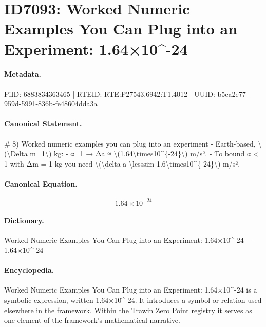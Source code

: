 \section*{ID7093: Worked Numeric Examples You Can Plug into an Experiment: 1.64×10\textasciicircum{}-24}
\paragraph{Metadata.}
PiID: 6883834363465 | RTEID: RTE:P27543.6942:T1.4012 | UUID: b5ca2e77-959d-5991-836b-fe48604dda3a

\paragraph{Canonical Statement.}
\# 8) Worked numeric examples you can plug into an experiment - Earth-based, \textbackslash{}(\textbackslash{}Delta m=1\textbackslash{}) kg: - α=1 → Δa ≈ \textbackslash{}(1.64\textbackslash{}times10\textasciicircum{}\{-24\}\textbackslash{}) m/s². - To bound α < 1 with Δm = 1 kg you need \textbackslash{}(\textbackslash{}delta a \textbackslash{}lesssim 1.6\textbackslash{}times10\textasciicircum{}\{-24\}\textbackslash{}) m/s².

\paragraph{Canonical Equation.}
\[
1.64\times10^{-24}
\]

\paragraph{Dictionary.}
Worked Numeric Examples You Can Plug into an Experiment: 1.64×10\textasciicircum{}-24 — 1.64×10\textasciicircum{}-24

\paragraph{Encyclopedia.}
Worked Numeric Examples You Can Plug into an Experiment: 1.64×10\textasciicircum{}-24 is a symbolic expression, written 1.64×10\textasciicircum{}-24. It introduces a symbol or relation used elsewhere in the framework. Within the Trawin Zero Point registry it serves as one element of the framework's mathematical narrative.
